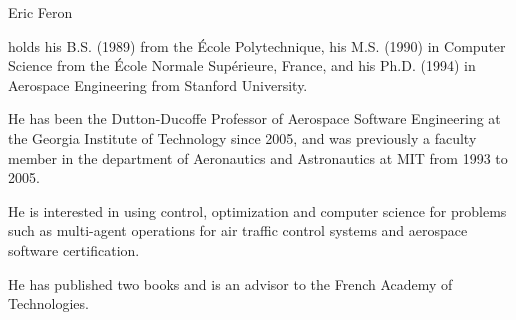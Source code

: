\documentclass[conference]{IEEEtran}
\begin{document}
\vspace*{-4\baselineskip}
\begin{IEEEbiographynophoto}{Eric Feron}
\scriptsize{holds his B.S. (1989) from the \'{E}cole Polytechnique, his M.S. (1990) in Computer Science from the \'{E}cole Normale Sup\'{e}rieure, France, and his Ph.D. (1994) in Aerospace Engineering from Stanford University.

He has been the Dutton-Ducoffe Professor of Aerospace Software Engineering at the Georgia Institute of Technology since 2005, and was previously a faculty member in the department of Aeronautics and Astronautics at MIT from 1993 to 2005.

He is interested in using control, optimization and computer science for problems such as multi-agent operations for air traffic control systems and aerospace software certification.

He has published two books and is an advisor to the French Academy of Technologies.} 
\end{IEEEbiographynophoto}
\end{document}
